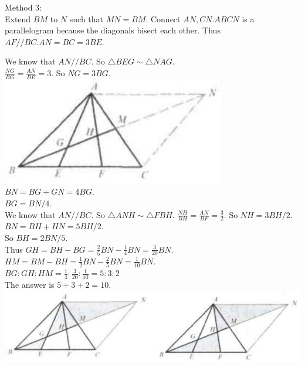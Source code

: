 \documentclass{article}
\begin{document}
Method 3:\\
Extend \(B M\) to \(N\) such that \(M N=B M\). Connect \(A N, C N . A B C N\) is a parallelogram because the diagonals bisect each other. Thus \(A F / / B C . A N=B C=3 B E\).

We know that \(A N / / B C\). So \(\triangle B E G \sim \triangle N A G\).\\
\(\frac{N G}{B G}=\frac{A N}{B E}=3\). So \(N G=3 B G\).\\
\centering
\includegraphics[width=\textwidth]{images/120(1).jpg}\\
\(B N=B G+G N=4 B G\).\\
\(B G=B N / 4\).\\
We know that \(A N / / B C\). So \(\triangle A N H \sim \triangle F B H\). \(\frac{N H}{B H}=\frac{A N}{B F}=\frac{3}{2}\). So \(N H=3 B H / 2\).\\
\(B N=B H+H N=5 B H / 2\).\\
So \(B H=2 B N / 5\).\\
Thus \(G H=B H-B G=\frac{2}{5} B N-\frac{1}{4} B N=\frac{3}{20} B N\).\\
\(H M=B M-B H=\frac{1}{2} B N-\frac{2}{5} B N=\frac{1}{10} B N\).\\
\(B G: G H: H M=\frac{1}{4}: \frac{3}{20}: \frac{1}{10}=5: 3: 2\)\\
The answer is \(5+3+2=10\).\\
\centering
\includegraphics[width=\textwidth]{images/120.jpg}
\end{document}
